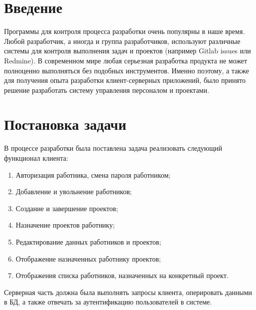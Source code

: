 \documentclass[14pt, a4paper]{extarticle}
\begin{document}
    \renewcommand\contentsname{Оглавление} %
    \tableofcontents
    \setcounter{page}{2}

    \pagebreak
    \section*{Введение}
    Программы для контроля процесса разработки очень популярны в наше время. Любой разработчик, а иногда и группа разработчиков, используют различные системы для контроля выполнения задач и проектов (например Gitlab issues или Redmine). В современном мире любая серьезная разработка продукта не может полноценно выполняться без подобных инструментов. Именно поэтому, а также для получения опыта разработки клиент-серверных приложений, было принято решение разработать систему управления персоналом и проектами.


    \newpage
    \section{Постановка задачи}
    В процессе разработки была поставлена задача реализовать следующий функционал клиента:
    \begin{enumerate} 
        \item Авторизация работника, смена пароля работником;
        \item Добавление и увольнение работников;
        \item Создание и завершение проектов;
        \item Назначение проектов работнику;
        \item Редактирование данных работников и проектов;
        \item Отображение назначенных работнику проектов;
        \item Отображения списка работников, назначенных на конкретный проект.
    \end{enumerate}
    Серверная часть должна была выполнять запросы клиента, оперировать данными в БД, а также отвечать за аутентификацию пользователей в системе.
\end{document}
